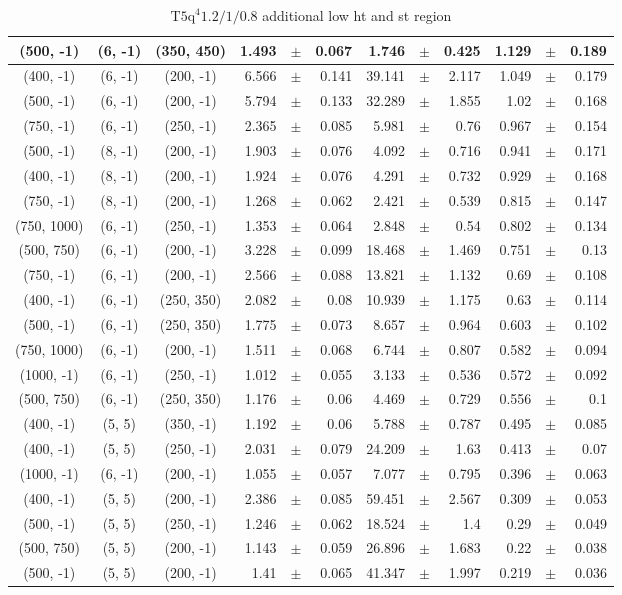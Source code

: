 \documentclass[12pt]{paper}
\newcommand{\TFiveqqqqHM}{\ensuremath{\textrm{T5q}^{4} 1.2/1/0.8}\xspace}
\begin{document}
\begin{table}[ht]
\begin{center}
{\begin{tabular}{|c|c|c|rrr|rrr|rrr|}
(500, -1)&(6, -1)&(350, 450)&1.493&$\pm$&0.067&1.746&$\pm$&0.425&1.129&$\pm$&0.189\\\hline
(400, -1)&(6, -1)&(200, -1)&6.566&$\pm$&0.141&39.141&$\pm$&2.117&1.049&$\pm$&0.179\\\hline
(500, -1)&(6, -1)&(200, -1)&5.794&$\pm$&0.133&32.289&$\pm$&1.855&1.02&$\pm$&0.168\\\hline
(750, -1)&(6, -1)&(250, -1)&2.365&$\pm$&0.085&5.981&$\pm$&0.76&0.967&$\pm$&0.154\\\hline
(500, -1)&(8, -1)&(200, -1)&1.903&$\pm$&0.076&4.092&$\pm$&0.716&0.941&$\pm$&0.171\\\hline
(400, -1)&(8, -1)&(200, -1)&1.924&$\pm$&0.076&4.291&$\pm$&0.732&0.929&$\pm$&0.168\\\hline
(750, -1)&(8, -1)&(200, -1)&1.268&$\pm$&0.062&2.421&$\pm$&0.539&0.815&$\pm$&0.147\\\hline
(750, 1000)&(6, -1)&(250, -1)&1.353&$\pm$&0.064&2.848&$\pm$&0.54&0.802&$\pm$&0.134\\\hline
(500, 750)&(6, -1)&(200, -1)&3.228&$\pm$&0.099&18.468&$\pm$&1.469&0.751&$\pm$&0.13\\\hline
(750, -1)&(6, -1)&(200, -1)&2.566&$\pm$&0.088&13.821&$\pm$&1.132&0.69&$\pm$&0.108\\\hline
(400, -1)&(6, -1)&(250, 350)&2.082&$\pm$&0.08&10.939&$\pm$&1.175&0.63&$\pm$&0.114\\\hline
(500, -1)&(6, -1)&(250, 350)&1.775&$\pm$&0.073&8.657&$\pm$&0.964&0.603&$\pm$&0.102\\\hline
(750, 1000)&(6, -1)&(200, -1)&1.511&$\pm$&0.068&6.744&$\pm$&0.807&0.582&$\pm$&0.094\\\hline
(1000, -1)&(6, -1)&(250, -1)&1.012&$\pm$&0.055&3.133&$\pm$&0.536&0.572&$\pm$&0.092\\\hline
(500, 750)&(6, -1)&(250, 350)&1.176&$\pm$&0.06&4.469&$\pm$&0.729&0.556&$\pm$&0.1\\\hline
(400, -1)&(5, 5)&(350, -1)&1.192&$\pm$&0.06&5.788&$\pm$&0.787&0.495&$\pm$&0.085\\\hline
(400, -1)&(5, 5)&(250, -1)&2.031&$\pm$&0.079&24.209&$\pm$&1.63&0.413&$\pm$&0.07\\\hline
(1000, -1)&(6, -1)&(200, -1)&1.055&$\pm$&0.057&7.077&$\pm$&0.795&0.396&$\pm$&0.063\\\hline
(400, -1)&(5, 5)&(200, -1)&2.386&$\pm$&0.085&59.451&$\pm$&2.567&0.309&$\pm$&0.053\\\hline
(500, -1)&(5, 5)&(250, -1)&1.246&$\pm$&0.062&18.524&$\pm$&1.4&0.29&$\pm$&0.049\\\hline
(500, 750)&(5, 5)&(200, -1)&1.143&$\pm$&0.059&26.896&$\pm$&1.683&0.22&$\pm$&0.038\\\hline
(500, -1)&(5, 5)&(200, -1)&1.41&$\pm$&0.065&41.347&$\pm$&1.997&0.219&$\pm$&0.036\\\hline
\end{tabular}}\end{center}\caption{\TFiveqqqqHM additional low ht and st region}\end{table}
\end{document}
